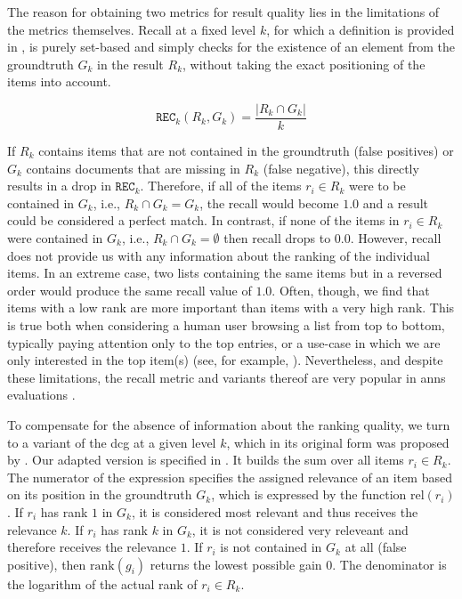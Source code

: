 The reason for obtaining two metrics for result quality lies in the limitations of the metrics themselves. Recall at a fixed level $k$, for which a definition is provided in , is purely set-based and simply checks for the existence of an element from the groundtruth $G_k$ in the result $R_k$, without taking the exact positioning of the items into account.

\begin{equation}
    \label{equation:recall}
    \texttt{REC}_k (R_k, G_k) = \frac{|R_k \cap G_k |}{k}
\end{equation}

If $R_k$ contains items that are not contained in the groundtruth (false positives) or $G_k$ contains documents that are missing in $R_k$ (false negative), this directly results in a drop in $\texttt{REC}_k$. Therefore, if all of the items $r_i \in R_k$ were to be contained in $G_k$, i.e., $R_k \cap G_k = G_k$, the recall would become $1.0$ and a result could be considered a perfect match. In contrast, if none of the items in $r_i \in R_k$ were contained in $G_k$, i.e., $R_k \cap G_k = \emptyset$ then recall drops to $0.0$. However, recall does not provide us with any information about the ranking of the individual items. In an extreme case, two lists containing the same items but in a reversed order would produce the same recall value of $1.0$. Often, though, we find that items with a low rank are more important than items with a very high rank. This is true both when considering a human user browsing a list from top to bottom, typically paying attention only to the top entries, or a use-case in which we are only interested in the top item(s) (see, for example, ). Nevertheless, and despite these limitations, the recall metric and variants thereof are very popular in \acrshort{anns} evaluations \cite{Aumueller:2017ANN,Simhadri:2022Results}. 

To compensate for the absence of information about the ranking quality, we turn to a variant of the \acrshort{dcg} at a given level $k$, which in its original form was proposed by \cite{Jarvelin:2002Cumulated}. Our adapted version is specified in . It builds the sum over all items $r_i \in R_k$. The numerator of the expression specifies the assigned relevance of an item based on its position in the groundtruth $G_k$, which is expressed by the function $\text{rel} (r_i)$. If $r_i$ has rank $1$ in $G_k$, it is considered most relevant and thus receives the relevance $k$. If $r_i$ has rank $k$ in $G_k$, it is not considered very releveant and therefore receives the relevance $1$. If $r_i$ is not contained in $G_k$ at all (false positive), then $\text{rank} (g_i)$ returns the lowest possible gain $0$. The denominator is the logarithm of the actual rank of $r_i \in R_k$. 


